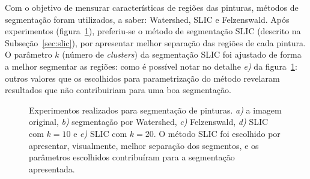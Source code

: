 Com o objetivo de mensurar características de regiões das pinturas, métodos de
segmentação foram utilizados, a saber: Watershed, SLIC e Felzenswald. Após
experimentos (figura~\ref{fig:expsegs}), preferiu-se o método de segmentação
SLIC (descrito na Subseção~\ref{sec:slic}), por apresentar melhor separação das
regiões de cada pintura. O parâmetro $k$ (número de \textit{clusters}) da
segmentação SLIC foi ajustado de forma a melhor segmentar as regiões: como é
possível notar no detalhe \textit{e)} da figura~\ref{fig:expsegs}: outros
valores que os escolhidos para parametrização do método revelaram resultados que
não contribuiriam para uma boa segmentação.

\begin{figure}[ht!]
\begin{center}
         \caption{Experimentos realizados para segmentação de pinturas. \textit{a)}
        a imagem original, \textit{b)} segmentação por Watershed, \textit{c)}
        Felzenswald, \textit{d)} SLIC com $k=10$ e \textit{e)} SLIC com
        $k=20$. O método SLIC foi escolhido por apresentar, visualmente,
        melhor separação dos segmentos, e os parâmetros escolhidos contribuíram
        para a segmentação apresentada.}
        \label{fig:expsegs}

\end{center}
\end{figure}
